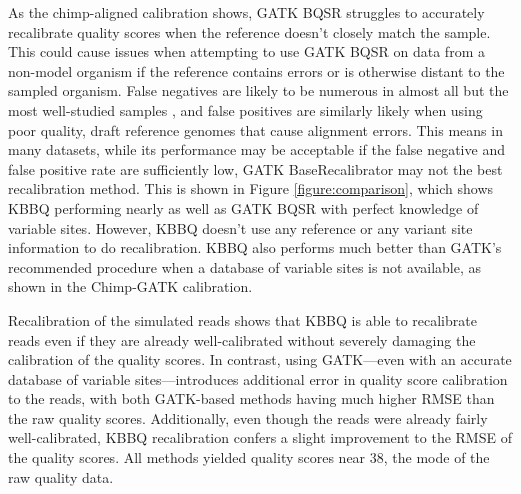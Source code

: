 As the chimp-aligned calibration shows, GATK BQSR struggles to accurately recalibrate quality scores when the reference doesn't closely match the sample. This could cause issues when attempting to use GATK BQSR on data from a non-model organism if the reference contains errors or is otherwise distant to the sampled organism. False negatives are likely to be numerous in almost all but the most well-studied samples \parencite{bobo_false_2016}, and false positives are similarly likely when using poor quality, draft reference genomes that cause alignment errors. This means in many datasets, while its performance may be acceptable if the false negative and false positive rate are sufficiently low, GATK BaseRecalibrator may not the best recalibration method. This is shown in Figure \ref{figure:comparison}, which shows KBBQ performing nearly as well as GATK BQSR with perfect knowledge of variable sites. However, KBBQ doesn't use any reference or any variant site information to do recalibration. KBBQ also performs much better than GATK's recommended procedure when a database of variable sites is not available, as shown in the Chimp-GATK calibration.

Recalibration of the simulated reads shows that KBBQ is able to recalibrate reads even if they are already well-calibrated without severely damaging the calibration of the quality scores. In contrast, using GATK---even with an accurate database of variable sites---introduces additional error in quality score calibration to the reads, with both GATK-based methods having much higher RMSE than the raw quality scores. Additionally, even though the reads were already fairly well-calibrated, KBBQ recalibration confers a slight improvement to the RMSE of the quality scores. All methods yielded quality scores near 38, the mode of the raw quality data.

